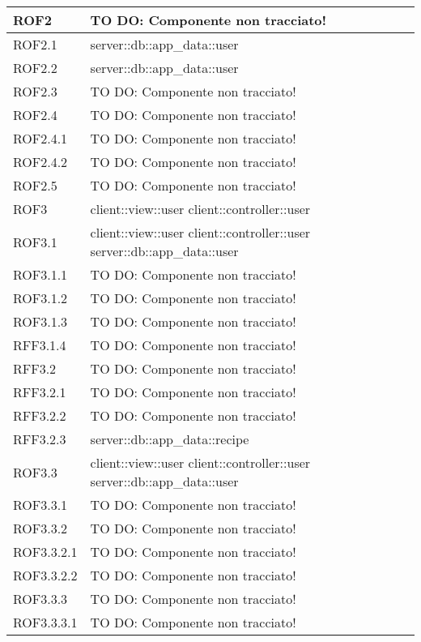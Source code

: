 \begin{center}
\begin{longtable}{| p{4cm} | p{8cm} |}
ROF2 & TO DO: Componente non tracciato! \\
\hline
ROF2.1 & server::db::app\_data::user \\
\hline
ROF2.2 & server::db::app\_data::user \\
\hline
ROF2.3 & TO DO: Componente non tracciato! \\
\hline
ROF2.4 & TO DO: Componente non tracciato! \\
\hline
ROF2.4.1 & TO DO: Componente non tracciato! \\
\hline
ROF2.4.2 & TO DO: Componente non tracciato! \\
\hline
ROF2.5 & TO DO: Componente non tracciato! \\
\hline
ROF3 & client::view::user \newline client::controller::user \\
\hline
ROF3.1 & client::view::user \newline client::controller::user \newline server::db::app\_data::user \\
\hline
ROF3.1.1 & TO DO: Componente non tracciato! \\
\hline
ROF3.1.2 & TO DO: Componente non tracciato! \\
\hline
ROF3.1.3 & TO DO: Componente non tracciato! \\
\hline
RFF3.1.4 & TO DO: Componente non tracciato! \\
\hline
RFF3.2 & TO DO: Componente non tracciato! \\
\hline
RFF3.2.1 & TO DO: Componente non tracciato! \\
\hline
RFF3.2.2 & TO DO: Componente non tracciato! \\
\hline
RFF3.2.3 & server::db::app\_data::recipe \\
\hline
ROF3.3 & client::view::user \newline client::controller::user \newline server::db::app\_data::user \\
\hline
ROF3.3.1 & TO DO: Componente non tracciato! \\
\hline
ROF3.3.2 & TO DO: Componente non tracciato! \\
\hline
ROF3.3.2.1 & TO DO: Componente non tracciato! \\
\hline
ROF3.3.2.2 & TO DO: Componente non tracciato! \\
\hline
ROF3.3.3 & TO DO: Componente non tracciato! \\
\hline
ROF3.3.3.1 & TO DO: Componente non tracciato! \\

\end{longtable}
\end{center}
